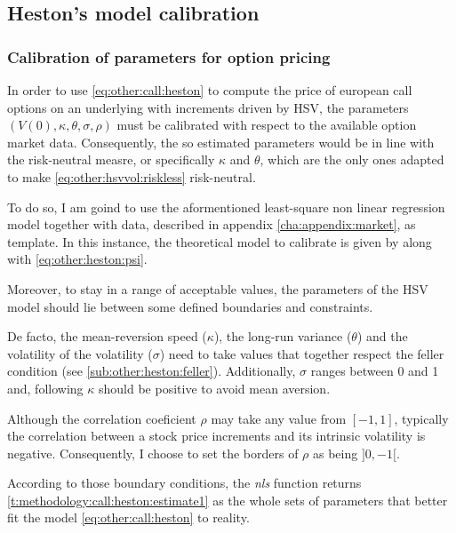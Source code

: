 \documentclass[12pt]{report}
\begin{document}
\subsection{Heston's model calibration}
\label{sub:methodology:calibration:heston}

\subsubsection*{Calibration of parameters for option pricing}

In order to use \cref{eq:other:call:heston} to compute the price of european call options on an underlying with increments driven by HSV, the parameters $(V(0), \kappa, \theta, \sigma, \rho)$ must be calibrated with respect to the available option market data.
Consequently, the so estimated parameters would be in line with the risk-neutral measre, or specifically $\kappa$ and $\theta$, which are the only ones adapted to make \cref{eq:other:hsvvol:riskless} risk-neutral.

To do so, I am goind to use the aformentioned least-square non linear regression model together with data, described in appendix \ref{cha:appendix:market}, as template.
In this instance, the theoretical model to calibrate is given by  along with \cref{eq:other:heston:psi}.

Moreover, to stay in a range of acceptable values, the parameters of the HSV model should lie between some defined boundaries and constraints. 

De facto, the mean-reversion speed ($\kappa$), the long-run variance ($\theta$) and the volatility of the volatility ($\sigma$) need to take values that together respect the feller condition (see \cref{sub:other:heston:feller}). Additionally, $\sigma$ ranges between 0 and 1 and, following \citet{cristo2015} $\kappa$ should be positive to avoid mean aversion.

Although the correlation coeficient $\rho$ may take any value from $[-1, 1]$, typically the correlation between a stock price increments and its intrinsic volatility is negative. Consequently, I choose to set the borders of $\rho$ as being $]0, -1[$.

According to those boundary conditions, the \textit{nls} function returns \cref{t:methodology:call:heston:estimate1} as the whole sets of parameters that better fit the model \cref{eq:other:call:heston} to reality.
\end{document}
